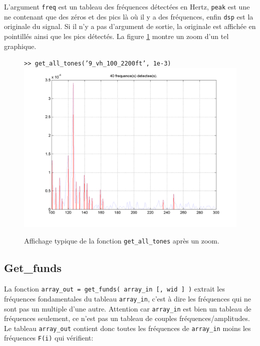     L'argument {\tt freq} est un tableau des fr{\'e}quences d{\'e}tect{\'e}es
    en Hertz, {\tt peak} est une \dsp ne contenant que des z{\'e}ros et
    des pics l{\`a} o{\`u} il y a des fr{\'e}quences, enfin {\tt dsp} est la
    \dsp originale du signal. Si il n'y a pas d'argument de sortie,
    la \dsp originale est affich{\'e}e en pointill{\'e}s ainsi que les pics
    d{\'e}tect{\'e}s. La figure \ref{figtones} montre un zoom d'un tel
    graphique.\\

    \newpage
    \begin{figure}[h]
      \centering
      {\tt >> get\_all\_tones('9\_vh\_100\_2200ft', 1e-3)}\\
      \includegraphics[width=12cm]{figures/tones.png}\\
      \caption{Affichage typique de la fonction {\tt get\_all\_tones} apr{\`e}s un zoom.}
      \label{figtones}
    \end{figure}
    \newpage


    \newpage
    \subsection{Get\_funds}
    \label{getfunds}
    La fonction {\tt array\_out = get\_funds( array\_in [, wid ] )}
    extrait les fr{\'e}quences fondamentales du tableau {\tt array\_in},
    c'est {\`a} dire les fr{\'e}quences qui ne sont pas un multiple d'une
    autre. Attention car {\tt array\_in} est bien un tableau
    de fr{\'e}quences seulement, ce n'est pas un tableau de couples
    fr{\'e}quences/amplitudes. Le tableau {\tt array\_out} contient
    donc toutes les fr{\'e}quences de {\tt array\_in} moins les
    fr{\'e}quences {\tt F(i)} qui v{\'e}rifient:

